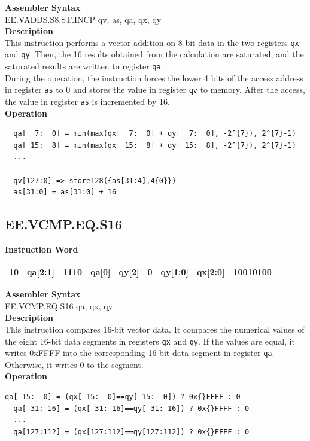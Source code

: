 \textbf{Assembler Syntax} \\
EE.VADDS.S8.ST.INCP qv, as, qa, qx, qy \\
\textbf{Description} \\
This instruction performs a vector addition on 8-bit data in the two registers \lstinline{qx} and \lstinline{qy}. Then, the 16 results obtained from the calculation are saturated, and the saturated results are written to register \lstinline{qa}. \\ During the operation, the instruction forces the lower 4 bits of the access address in register \lstinline{as} to 0 and stores the value in register \lstinline{qv} to memory. After the access, the value in register \lstinline{as} is incremented by 16.\\
\textbf{Operation}
\begin{lstlisting}
  qa[  7:  0] = min(max(qx[  7:  0] + qy[  7:  0], -2^{7}), 2^{7}-1)
  qa[ 15:  8] = min(max(qx[ 15:  8] + qy[ 15:  8], -2^{7}), 2^{7}-1)
  ...

  qv[127:0] => store128({as[31:4],4{0}})
  as[31:0] = as[31:0] + 16
\end{lstlisting}

\clearpage
\subsection{EE.VCMP.EQ.S16}\label{instruction:EEVCMPEQS16}
\setlength\tabcolsep{6pt}
\textbf{Instruction Word} \\
\begin{tabular}{|c|c|c|c|c|c|c|c|c|}
	\hline
	10 & qa[2:1] & 1110 & qa[0] & qy[2] & 0 & qy[1:0] & qx[2:0] & 10010100 \\
	\hline
\end{tabular}

\textbf{Assembler Syntax} \\
EE.VCMP.EQ.S16 qa, qx, qy \\
\textbf{Description} \\
This instruction compares 16-bit vector data. It compares the numerical values of the eight 16-bit data segments in registers \lstinline{qx} and \lstinline{qy}. If the values are equal, it writes 0x{}FFFF into the corresponding 16-bit data segment in register \lstinline{qa}. Otherwise, it writes 0 to the segment.\\
\textbf{Operation}
\begin{lstlisting}[escapeinside=`?]
  qa[ 15:  0] = (qx[ 15:  0]==qy[ 15:  0]) ? 0x{}FFFF : 0
  qa[ 31: 16] = (qx[ 31: 16]==qy[ 31: 16]) ? 0x{}FFFF : 0
  ...
  qa[127:112] = (qx[127:112]==qy[127:112]) ? 0x{}FFFF : 0
\end{lstlisting}

